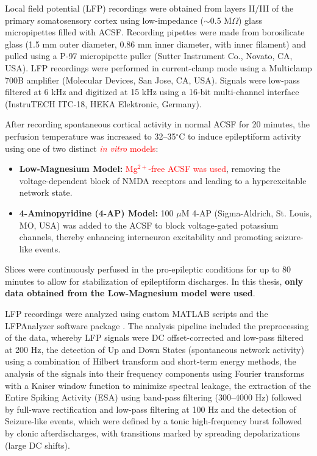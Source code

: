 \documentclass{article}
\begin{document}
Local field potential (LFP) recordings were obtained from layers II/III of the primary somatosensory cortex using low-impedance ($\sim$0.5 M$\Omega$) glass micropipettes filled with ACSF. Recording pipettes were made from borosilicate glass (1.5 mm outer diameter, 0.86 mm inner diameter, with inner filament) and pulled using a P-97 micropipette puller (Sutter Instrument Co., Novato, CA, USA). LFP recordings were performed in current-clamp mode using a Multiclamp 700B amplifier (Molecular Devices, San Jose, CA, USA). Signals were low-pass filtered at 6 kHz and digitized at 15 kHz using a 16-bit multi-channel interface (InstruTECH ITC-18, HEKA Elektronic, Germany).

After recording spontaneous cortical activity in normal ACSF for 20 minutes, the perfusion temperature was increased to 32--35$^{\circ}$C to induce epileptiform activity using one of two distinct \textcolor{red}{\textit{in vitro} models}:

\begin{itemize}
    \item \textbf{Low-Magnesium Model:} \textcolor{red}{Mg$^{2+}$-free ACSF was used}, removing the voltage-dependent block of NMDA receptors and leading to a hyperexcitable network state.
    \item \textbf{4-Aminopyridine (4-AP) Model:} 100 $\mu$M 4-AP (Sigma-Aldrich, St. Louis, MO, USA) was added to the ACSF to block voltage-gated potassium channels, thereby enhancing interneuron excitability and promoting seizure-like events.
\end{itemize}

Slices were continuously perfused in the pro-epileptic conditions for up to 80 minutes to allow for stabilization of epileptiform discharges. In this thesis, \textbf{only data obtained from the Low-Magnesium model were used}.

LFP recordings were analyzed using custom MATLAB scripts and the LFPAnalyzer software package \cite{kaplanian2022, tsakanikas2017}. The analysis pipeline included the preprocessing of the data, whereby LFP signals were DC offset-corrected and low-pass filtered at 200 Hz, the detection of Up and Down States (spontaneous network activity) using a combination of Hilbert transform and short-term energy methods, the analysis of the signals into their frequency components using Fourier transforms with a Kaiser window function to minimize spectral leakage, the extraction of the Entire Spiking Activity (ESA) using band-pass filtering (300--4000 Hz) followed by full-wave rectification and low-pass filtering at 100 Hz and the detection of Seizure-like events, which were defined by a tonic high-frequency burst followed by clonic afterdischarges, with transitions marked by spreading depolarizations (large DC shifts).
\end{document}
